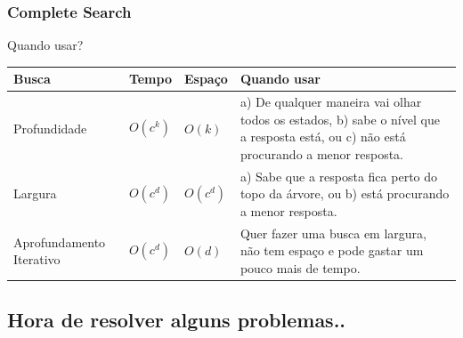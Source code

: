 \begin{frame}
\frametitle{Complete Search}
\begin{block}{Quando usar?}
\begin{table}
    \begin{tabular}{|p{2.5cm}|l|l|p{5cm}|}
        \hline
        Busca                    & Tempo    & Espaço    & Quando usar                                                                                                                \\ \hline
        Profundidade             & $O(c^k)$ & $O(k)$    & a) De qualquer maneira vai olhar todos os estados, b) sabe o nível que a resposta está, ou c) não está procurando a menor resposta. \\ \hline
        Largura                  & $O(c^d)$ & $O(c^d)$  & a) Sabe que a resposta fica perto do topo da árvore, ou b) está procurando a menor resposta.                                     \\ \hline
        Aprofundamento Iterativo & $O(c^d)$ & $O(d)$    & Quer fazer uma busca em largura, não tem espaço e pode gastar um pouco mais de tempo.                                       \\
        \hline
    \end{tabular}
\end{table}
\end{block}
\end{frame}

\subsection{Hora de resolver alguns problemas..}

